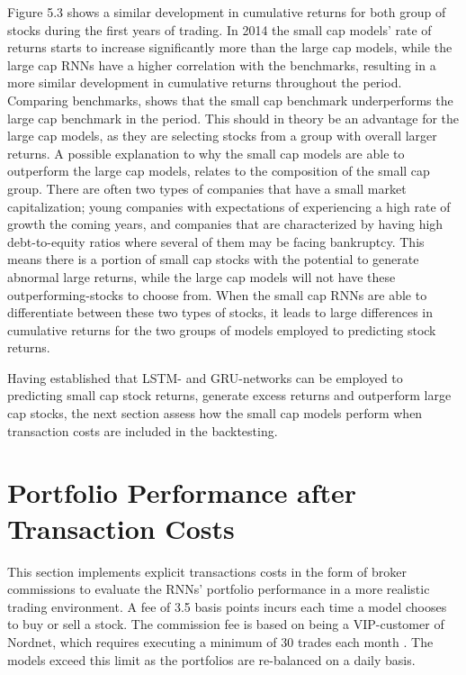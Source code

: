 \indent\newline 
Figure 5.3 shows a similar development in cumulative returns for both group of stocks during the first years of trading. In 2014 the small cap models' rate of returns starts to increase significantly more than the large cap models, while the large cap RNNs have a higher correlation with the benchmarks, resulting in a more similar development in cumulative returns throughout the period. Comparing benchmarks, shows that the small cap benchmark underperforms the large cap benchmark in the period. This should in theory be an advantage for the large cap models, as they are selecting stocks from a group with overall larger returns. A possible explanation to why the small cap models are able to outperform the large cap models, relates to the composition of the small cap group. There are often two types of companies that have a small market capitalization; young companies with expectations of experiencing a high rate of growth the coming years, and companies that are characterized by having high debt-to-equity ratios where several of them may be facing bankruptcy. This means there is a portion of small cap stocks with the potential to generate abnormal large returns, while the large cap models will not have these outperforming-stocks to choose from. When the small cap RNNs are able to differentiate between these two types of stocks, it leads to large differences in cumulative returns for the two groups of models employed to predicting stock returns. 

\indent\newline 
Having established that LSTM- and GRU-networks can be employed to predicting small cap stock returns, generate excess returns and outperform large cap stocks, the next section assess how the small cap models perform when transaction costs are included in the backtesting.

\section{Portfolio Performance after Transaction Costs}
This section implements explicit transactions costs in the form of broker commissions to evaluate the RNNs' portfolio performance in a more realistic trading environment. A fee of 3.5 basis points incurs each time a model chooses to buy or sell a stock. The commission fee is based on being a VIP-customer of Nordnet, which requires executing a minimum of 30 trades each month \cite{nordnet}. The models exceed this limit as the portfolios are re-balanced on a daily basis. 

